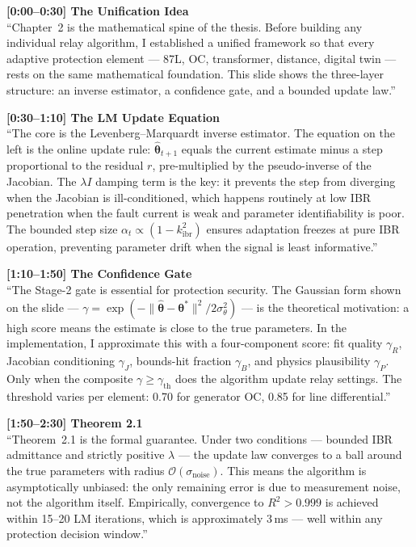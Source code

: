 \documentclass[12pt,a4paper]{article}
\newcommand{\kibr}{k_\mathrm{ibr}}
\newcommand{\thetahat}{\hat{\bm{\theta}}}
\newcommand{\thetastar}{\bm{\theta}^*}
\begin{document}
\begin{speakbox}
\textbf{[0:00--0:30] The Unification Idea}\\
``Chapter~2 is the mathematical spine of the thesis.  Before building any individual
relay algorithm, I established a unified framework so that every adaptive protection
element --- 87L, OC, transformer, distance, digital twin --- rests on the same
mathematical foundation.  This slide shows the three-layer structure: an inverse
estimator, a confidence gate, and a bounded update law.''

\medskip
\textbf{[0:30--1:10] The LM Update Equation}\\
``The core is the Levenberg--Marquardt inverse estimator.  The equation on the left
is the online update rule: $\thetahat_{t+1}$ equals the current estimate minus a
step proportional to the residual $r$, pre-multiplied by the pseudo-inverse of the
Jacobian.  The $\lambda I$ damping term is the key: it prevents the step from
diverging when the Jacobian is ill-conditioned, which happens routinely at low IBR
penetration when the fault current is weak and parameter identifiability is poor.
The bounded step size $\alpha_t \propto (1-\kibr^2)$ ensures adaptation freezes at
pure IBR operation, preventing parameter drift when the signal is least informative.''

\medskip
\textbf{[1:10--1:50] The Confidence Gate}\\
``The Stage-2 gate is essential for protection security.  The Gaussian form shown on
the slide --- $\gamma = \exp(-\|\thetahat - \thetastar\|^2 / 2\sigma_\theta^2)$ ---
is the theoretical motivation: a high score means the estimate is close to the true
parameters.  In the implementation, I approximate this with a four-component score:
fit quality $\gamma_R$, Jacobian conditioning $\gamma_J$, bounds-hit fraction $\gamma_B$,
and physics plausibility $\gamma_P$.  Only when the composite $\gamma \geq \gamma_\mathrm{th}$
does the algorithm update relay settings.  The threshold varies per element: 0.70 for
generator OC, 0.85 for line differential.''

\medskip
\textbf{[1:50--2:30] Theorem 2.1}\\
``Theorem~2.1 is the formal guarantee.  Under two conditions --- bounded IBR admittance
and strictly positive $\lambda$ --- the update law converges to a ball around the true
parameters with radius $\mathcal{O}(\sigma_\mathrm{noise})$.  This means the algorithm
is asymptotically unbiased: the only remaining error is due to measurement noise, not
the algorithm itself.  Empirically, convergence to $R^2 > 0.999$ is achieved within
15--20 LM iterations, which is approximately 3\,ms --- well within any protection
decision window.''


\end{speakbox}
\end{document}
